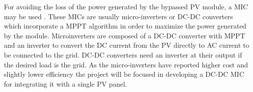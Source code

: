 For avoiding the loss of the power generated by the bypassed PV module, a MIC may be used \cite{ArchitectureMIC}. %
These MICs are usually micro-inverters or DC-DC converters which incorporate a MPPT algorithm in order to maximize the power generated by the module. 
Microinverters are composed of a DC-DC converter with MPPT and an inverter to convert the DC current from the PV directly to AC current to be connected to the grid. DC-DC converters need an inverter at their output if the desired load is the grid. 
As the micro-inverters have reported higher cost and slightly lower efficiency \cite{ArchitectureMIC} %
the project will be focused in developing a DC-DC MIC for integrating it with a single PV panel.





